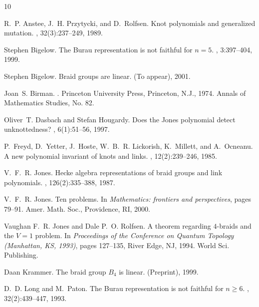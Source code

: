 \documentclass[10pt]{amsart}
\theoremstyle{plain}
\theoremstyle{definition}
\begin{document}
\begin{thebibliography}{10}

R.~P. Anstee, J.~H. Przytycki, and D.~Rolfsen.
\newblock Knot polynomials and generalized mutation.
, 32(3):237--249, 1989.

Stephen Bigelow.
\newblock The {B}urau representation is not faithful for $n=5$.
, 3:397--404, 1999.

Stephen Bigelow.
\newblock Braid groups are linear.
\newblock (To appear), 2001.

Joan~S. Birman.
.
\newblock Princeton University Press, Princeton, N.J., 1974.
\newblock Annals of Mathematics Studies, No. 82.

Oliver~T. Dasbach and Stefan Hougardy.
\newblock Does the {J}ones polynomial detect unknottedness?
, 6(1):51--56, 1997.

P.~Freyd, D.~Yetter, J.~Hoste, W.~B.~R. Lickorish, K.~Millett, and A.~Ocneanu.
\newblock A new polynomial invariant of knots and links.
, 12(2):239--246, 1985.

V.~F.~R. Jones.
\newblock Hecke algebra representations of braid groups and link polynomials.
, 126(2):335--388, 1987.

V.~F.~R. Jones.
\newblock Ten problems.
\newblock In {\em Mathematics: frontiers and perspectives}, pages 79--91. Amer.
  Math. Soc., Providence, RI, 2000.

Vaughan F.~R. Jones and Dale P.~O. Rolfsen.
\newblock A theorem regarding $4$-braids and the ${V}=1$ problem.
\newblock In {\em Proceedings of the Conference on Quantum Topology (Manhattan,
  KS, 1993)}, pages 127--135, River Edge, NJ, 1994. World Sci. Publishing.

Daan Krammer.
\newblock The braid group ${B}_4$ is linear.
\newblock (Preprint), 1999.

D.~D. Long and M.~Paton.
\newblock The {B}urau representation is not faithful for $n\geq 6$.
, 32(2):439--447, 1993.

\end{thebibliography}
\end{document}
